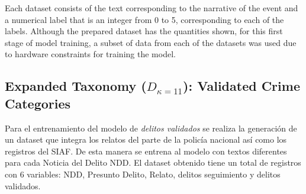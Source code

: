 \documentclass[onecolumn, journal, english, 12pt, a4paper]{IEEEtran} %
\theoremstyle{definition}
\begin{document}
Each dataset consists of the text corresponding to the narrative of
the event and a numerical label that is an integer from 0 to 5,
corresponding to each of the labels. Although the prepared dataset has
the quantities shown, for this first stage of model training, a subset
of data from each of the datasets was used due to hardware constraints
for training the model.

\subsection{Expanded Taxonomy (\(D_{\kappa=11}\)): Validated Crime
  Categories}
\label{sec:expand-taxon-d_validados}
Para el entrenamiento del modelo de \emph{delitos validados} se
realiza la generación de un dataset que integra los relatos del parte
de la policía nacional así como los registros del SIAF. De esta manera
se entrena al modelo con textos diferentes para cada Noticia del
Delito NDD. El dataset obtenido tiene un total de 
registros con 6 variables: NDD, Presunto Delito, Relato, delitos
seguimiento y delitos validados.
\end{document}
